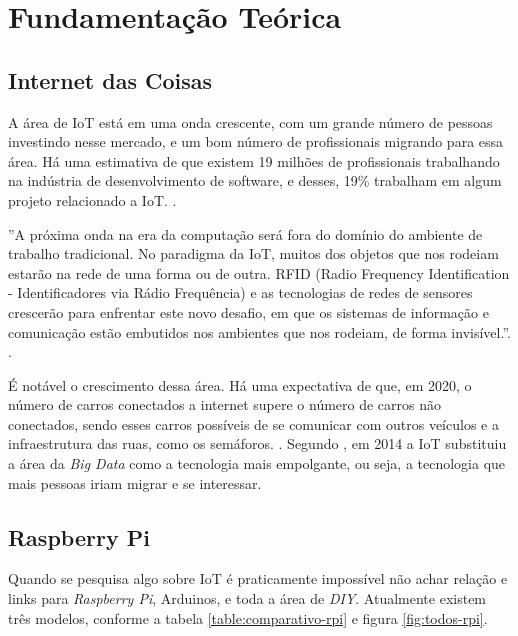 \chapter{Fundamentação Teórica}\label{cap:fundamentacao-teorica}

\section{Internet das Coisas}\label{sec:internet-das-coisas}

A área de IoT está em uma onda crescente, com um grande número de pessoas investindo nesse mercado, e um bom número de profissionais migrando para essa área. Há uma estimativa de que existem 19 milhões de profissionais trabalhando na indústria de desenvolvimento de software, e desses, 19\% trabalham em algum projeto relacionado a IoT. \cite{cw-iot}.

\begin{citacao}
''A próxima onda na era da computação será fora do domínio do ambiente de trabalho tradicional. No paradigma da IoT, muitos dos objetos que nos rodeiam estarão na rede de uma forma ou de outra. RFID (Radio Frequency Identification - Identificadores via Rádio Frequência) e as tecnologias de redes de sensores crescerão para enfrentar este novo desafio, em que os sistemas de informação e comunicação estão embutidos nos ambientes que nos rodeiam, de forma invisível.''. \cite{iot-article}. 
\end{citacao}

É notável o crescimento dessa área. Há uma expectativa de que, em 2020, o número de carros conectados a internet supere o número de carros não conectados, sendo esses carros possíveis de se comunicar com outros veículos e a infraestrutura das ruas, como os semáforos. \cite{goldmansachs-iot}. Segundo , em 2014 a IoT substituiu a área da \textit{Big Data} como a tecnologia mais empolgante, ou seja, a tecnologia que mais pessoas iriam migrar e se interessar. 


\section{Raspberry Pi}\label{sec:raspberry-pi}

Quando se pesquisa algo sobre IoT é praticamente impossível não achar relação e links para \textit{Raspberry Pi}, Arduinos, e toda a área de \textit{DIY}. Atualmente existem três modelos, conforme a tabela \autoref{table:comparativo-rpi} e figura \autoref{fig:todos-rpi}. 


